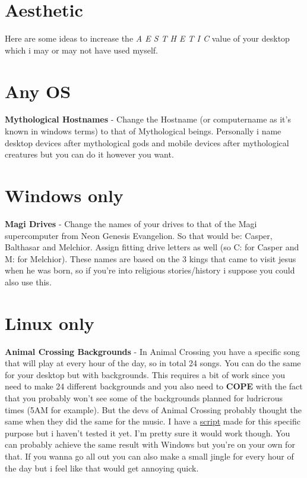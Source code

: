 \documentclass{article}
\begin{document}
\section{Aesthetic}
Here are some ideas to increase the \emph{A E S T H E T I C} value of your desktop which i may or may not have used myself.
\section{Any OS}
\textbf{Mythological Hostnames} - Change the Hostname (or computername as it's known in windows terms) to that of Mythological beings. Personally i name desktop devices after mythological gods and mobile devices after mythological creatures but you can do it however you want.
\section{Windows only}
\textbf{Magi Drives} - Change the names of your drives to that of the Magi supercomputer from Neon Genesis Evangelion. So that would be: Casper, Balthasar and Melchior. Assign fitting drive letters as well (so C: for Casper and M: for Melchior). These names are based on the 3 kings that came to visit jesus when he was born, so if you're into religious stories/history i suppose you could also use this.
\section{Linux only}
\textbf{Animal Crossing Backgrounds} - In Animal Crossing you have a specific song that will play at every hour of the day, so in total 24 songs. You can do the same for your desktop but with backgrounds. This requires a bit of work since you need to make 24 different backgrounds and you also need to \textbf{COPE} with the fact that you probably won't see some of the backgrounds planned for ludricrous times (5AM for example). But the devs of Animal Crossing probably thought the same when they did the same for the music. I have a \href{https://github.com/marcello505/configfiles/blob/master/.scripts/clockbackgrounds.sh}{script} made for this specific purpose but i haven't tested it yet. I'm pretty sure it would work though. You can probably achieve the same result with Windows but you're on your own for that. If you wanna go all out you can also make a small jingle for every hour of the day but i feel like that would get annoying quick.
\end{document}
